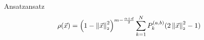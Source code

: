 \begin{definition}{Ansatz}{ansatz}
  $$\rho(\vec{x}) = \left(1-\left\lVert\vec{x}\right\rVert_{\scriptscriptstyle 2}^{2}\right)^{m - \frac{\alpha + d}{2}} \sum_{k=1}^{N} P_{k}^{(a,b)}(2 \left\lVert\vec{x}\right\rVert_{\scriptscriptstyle 2}^{2}-1)$$

\end{definition}
